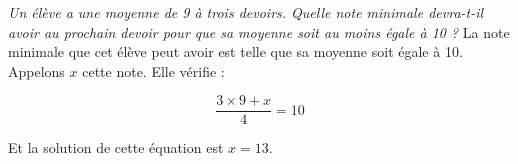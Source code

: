 \documentclass[12pt]{article}
\begin{document}
\begin{exercice}[Moyenne]
  \emph{Un élève a une moyenne de 9 à trois devoirs. Quelle note minimale devra-t-il avoir au prochain devoir pour que sa moyenne soit au moins égale à 10 ?} La note minimale que cet élève peut avoir est telle que sa moyenne soit égale à 10. Appelons $x$ cette note. Elle vérifie :

  \[\frac{3\times9+x}{4}=10\]

  Et la solution de cette équation est $x=13$.
\end{exercice}
\end{document}
